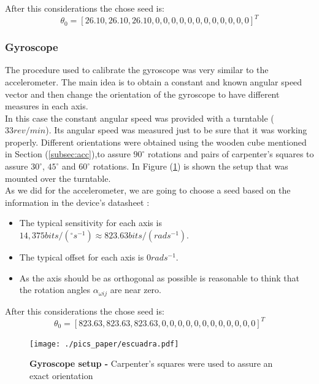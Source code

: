 \documentclass[conference]{IEEEtran}
\newcommand{\refp}[1]{(\ref{#1})}
\begin{document}
After this considerations the chose seed is:
\begin{equation}
{\theta}_0 = [26.10, 26.10, 26.10, 0, 0, 0, 0, 0, 0, 0, 0, 0, 0, 0, 0]^T
\end{equation}
\subsubsection{Gyroscope}

The procedure used to calibrate the gyroscope was very similar to the accelerometer. The main idea is to obtain a constant and known angular speed vector and then change the orientation of the gyroscope to have different measures in each axis.\\

In this case the constant angular speed was provided with a turntable ($33 rev/min$). Its angular speed was measured just to be sure that it was working properly. Different orientations were obtained using the wooden cube mentioned in Section \refp{subsec:acc},to assure $90^\circ$ rotations and pairs of carpenter's squares to assure $30^\circ$, $45^\circ$ and $60^\circ$ rotations. In Figure \refp{fig:setup_gyro} is shown the setup that was mounted over the turntable.\\

As we did for the accelerometer, we are going to choose a seed based on the information in the device's datasheet \cite{bib:gyro_data}: 

\begin{itemize}
\item The typical sensitivity for each axis is $14,375 bits/(^\circ s^{-1})\approx 823.63 bits/(rad s^{-1})$.
\item The typical offset for each axis is $0 rad s^{-1}$.
\item As the axis should be as orthogonal as possible is reasonable to think that the rotation angles $\alpha_{\omega ij}$ are near zero. 
\end{itemize}

After this considerations the chose seed is:
\begin{equation}
{\theta}_0 = [823.63, 823.63, 823.63, 0, 0, 0, 0, 0, 0, 0, 0, 0, 0, 0, 0]^T
\end{equation}

\begin{figure}
	\centering
	\texttt{[image: ./pics\_paper/escuadra.pdf]}
	\caption{\textbf{Gyroscope setup - }Carpenter's squares were used to assure an exact orientation}
	\label{fig:setup_gyro}
\end{figure}
\end{document}
